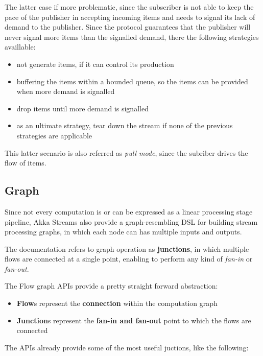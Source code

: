 The latter case if more problematic, since the subscriber is not able to
keep the pace of the publisher in accepting incoming items and needs to
signal its lack of demand to the publisher. Since the protocol
guarantees that the publisher will never signal more items than the
signalled demand, there the following strategies availlable:

\begin{itemize}
\itemsep1pt\parskip0pt
\item
  not generate items, if it can control its production
\item
  buffering the items within a bounded queue, so the items can be
  provided when more demand is signalled
\item
  drop items until more demand is signalled
\item
  as an ultimate strategy, tear down the stream if none of the previous
  strategies are applicable
\end{itemize}

This latter scenario is also referred as \emph{pull mode}, since the
subriber drives the flow of items.

\subsection{Graph}\label{graph}

Since not every computation is or can be expressed as a linear
processing stage pipeline, Akka Streams also provide a graph-resembling
DSL for building stream processing graphs, in which each node can has
multiple inputs and outputs.

The documentation refers to graph operation as \textbf{junctions}, in
which multiple flows are connected at a single point, enabling to
perform any kind of \emph{fan-in} or \emph{fan-out}.

The Flow graph APIs provide a pretty straight forward abstraction:

\begin{itemize}
\itemsep1pt\parskip0pt
\item
  \textbf{Flow}s represent the \textbf{connection} within the
  computation graph
\item
  \textbf{Junction}s represent the \textbf{fan-in and fan-out} point to
  which the flows are connected
\end{itemize}

The APIs already provide some of the most useful juctions, like the
following:

